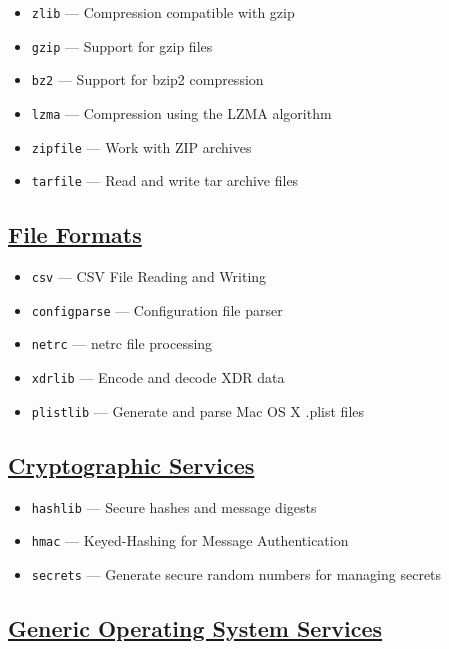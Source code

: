 \documentclass[]{book}
\providecommand{\tightlist}{%
  \setlength{\itemsep}{0pt}\setlength{\parskip}{0pt}}
\theoremstyle{definition}
\theoremstyle{definition}
\theoremstyle{definition}
\theoremstyle{remark}
\begin{document}
\begin{itemize}
\tightlist
\item
  \texttt{zlib} --- Compression compatible with gzip
\item
  \texttt{gzip} --- Support for gzip files
\item
  \texttt{bz2} --- Support for bzip2 compression
\item
  \texttt{lzma} --- Compression using the LZMA algorithm
\item
  \texttt{zipfile} --- Work with ZIP archives
\item
  \texttt{tarfile} --- Read and write tar archive files
\end{itemize}

\subsection{\texorpdfstring{\href{https://docs.python.org/3.7/library/fileformats.html}{File
Formats}}{File Formats}}\label{file-formats}

\begin{itemize}
\tightlist
\item
  \texttt{csv} --- CSV File Reading and Writing
\item
  \texttt{configparse} --- Configuration file parser
\item
  \texttt{netrc} --- netrc file processing
\item
  \texttt{xdrlib} --- Encode and decode XDR data
\item
  \texttt{plistlib} --- Generate and parse Mac OS X .plist files
\end{itemize}

\subsection{\texorpdfstring{\href{https://docs.python.org/3.7/library/crypto.html}{Cryptographic
Services}}{Cryptographic Services}}\label{cryptographic-services}

\begin{itemize}
\tightlist
\item
  \texttt{hashlib} --- Secure hashes and message digests
\item
  \texttt{hmac} --- Keyed-Hashing for Message Authentication
\item
  \texttt{secrets} --- Generate secure random numbers for managing
  secrets
\end{itemize}

\subsection{\texorpdfstring{\href{https://docs.python.org/3.7/library/allos.html}{Generic
Operating System
Services}}{Generic Operating System Services}}\label{generic-operating-system-services}
\end{document}
